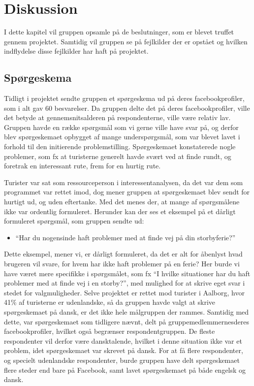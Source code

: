 \chapter{Diskussion}
I dette kapitel vil gruppen opsamle på de beslutninger, som er blevet truffet gennem projektet. Samtidig vil gruppen se på fejlkilder der er opstået og hvilken indflydelse disse fejlkilder har haft på projektet. 

\section{Spørgeskema}
Tidligt i projektet sendte gruppen et spørgeskema ud på deres facebookprofiler, som i alt gav 60 besvarelser. Da gruppen delte det på deres facebookprofiler, ville det betyde at gennemsnitsalderen på respondenterne, ville være relativ lav. Gruppen havde en række spørgsmål som vi gerne ville have svar på, og derfor blev spørgeskemaet opbygget af mange underspørgsmål, som var blevet lavet i forhold til den initierende problemstilling. Spørgeskemaet konstaterede nogle problemer, som fx at turisterne generelt havde svært ved at finde rundt, og foretrak en interessant rute, frem for en hurtig rute. 

Turister var sat som ressourceperson i interessentanalysen, da det var dem som programmet var rettet imod, dog mener gruppen at spørgeskemaet blev sendt for hurtigt ud, og uden eftertanke. Med det menes der, at mange af spørgsmålene ikke var ordentlig formuleret. Herunder kan der ses et eksempel på et dårligt formuleret spørgsmål, som gruppen sendte ud: \newline
\begin{itemize}
	\item “Har du nogensinde haft problemer med at finde vej på din storbyferie?” 
\end{itemize}
Dette eksempel, mener vi, er dårligt formuleret, da det er alt for åbenlyst hvad brugeren vil svare, for hvem har ikke haft problemer på en ferie? Her burde vi have været mere specifikke i spørgsmålet, som fx “I hvilke situationer har du haft problemer med at finde vej i en storby?”, med mulighed for at skrive eget svar i stedet for valgmuligheder. \newline
Selve projektet er rettet mod turister i Aalborg, hvor 41\% af turisterne er udenlandske, så da gruppen havde valgt at skrive spørgeskemaet på dansk, er det ikke hele målgruppen der rammes. Samtidig med dette, var spørgeskemaet som tidligere nævnt, delt på gruppemedlemmernesderes facebookprofiler, hvilket også begrænser respondentgruppen. De fleste respondenter vil derfor være dansktalende, hvilket i denne situation ikke var et problem, idet spørgeskemaet var skrevet på dansk. For at få flere respondenter, og specielt udenlandske respondenter, burde gruppen have delt spørgeskemaet flere steder end bare på Facebook, samt lavet spørgeskemaet på både engelsk og dansk. 

